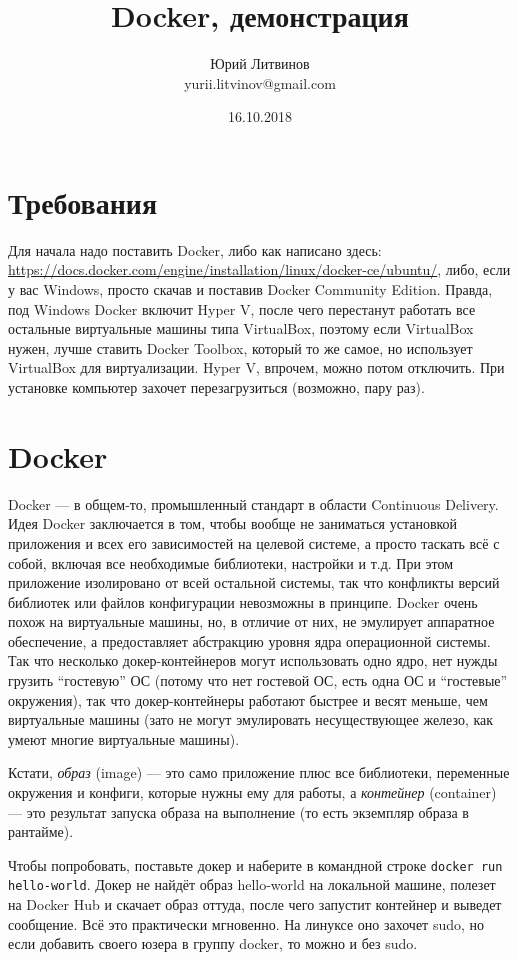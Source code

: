 \documentclass[a5paper]{article}
\title{Docker, демонстрация}
\author{Юрий Литвинов\\\small{yurii.litvinov@gmail.com}}
\date{16.10.2018}
\begin{document}
\maketitle
\thispagestyle{empty}

\section{Требования}

Для начала надо поставить Docker, либо как написано здесь: \url{https://docs.docker.com/engine/installation/linux/docker-ce/ubuntu/}, либо, если у вас Windows, просто скачав и поставив Docker Community Edition.
Правда, под Windows Docker включит Hyper V, после чего перестанут работать все остальные виртуальные машины типа VirtualBox, поэтому если VirtualBox нужен, лучше ставить Docker Toolbox, который то же самое, но
использует VirtualBox для виртуализации. Hyper V, впрочем, можно потом отключить. При установке компьютер захочет перезагрузиться (возможно, пару раз).

\section{Docker}

Docker --- в общем-то, промышленный стандарт в области Continuous Delivery. Идея Docker заключается в том, чтобы вообще не заниматься установкой приложения
и всех его зависимостей на целевой системе, а просто таскать всё с собой, включая все необходимые библиотеки, настройки и т.д. При этом приложение изолировано от всей остальной системы, так что конфликты версий библиотек или файлов конфигурации невозможны в принципе. Docker очень похож на виртуальные машины, но, в отличие от них, не эмулирует аппаратное обеспечение, а предоставляет абстракцию уровня ядра операционной системы. Так что несколько докер-контейнеров могут использовать одно ядро, нет нужды грузить ``гостевую'' ОС (потому что нет гостевой ОС, есть одна ОС и ``гостевые'' окружения), так что докер-контейнеры работают быстрее и весят меньше, чем виртуальные машины (зато не могут эмулировать несуществующее железо, как умеют многие виртуальные машины).

Кстати, \textit{образ} (image) --- это само приложение плюс все библиотеки, переменные окружения и конфиги, которые нужны ему для работы, а \textit{контейнер} (container) --- это результат запуска образа  на выполнение (то есть экземпляр образа в рантайме).

Чтобы попробовать, поставьте докер и наберите в командной строке \verb|docker run hello-world|. Докер не найдёт образ hello-world на локальной машине, полезет на Docker Hub и скачает образ оттуда, после чего запустит контейнер и выведет сообщение. Всё это практически мгновенно. На линуксе оно захочет sudo, но если добавить своего юзера в группу docker, то можно и без sudo.
\end{document}
